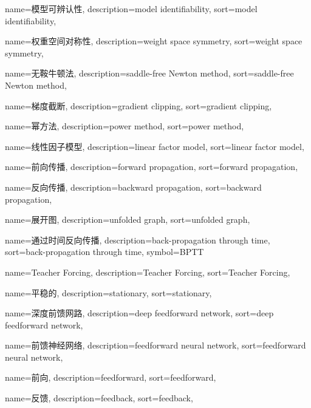 {
  name=模型可辨认性,
  description={model identifiability},
  sort={model identifiability},
}

{
  name=权重空间对称性,
  description={weight space symmetry},
  sort={weight space symmetry},
}

{
  name=无鞍牛顿法,
  description={saddle-free Newton method},
  sort={saddle-free Newton method},
}

{
  name=梯度截断,
  description={gradient clipping},
  sort={gradient clipping},
}

{
  name=幂方法,
  description={power method},
  sort={power method},
}

{
  name=线性因子模型,
  description={linear factor model},
  sort={linear factor model},
}

{
  name=前向传播,
  description={forward propagation},
  sort={forward propagation},
}

{
  name=反向传播,
  description={backward propagation},
  sort={backward propagation},
}

{
  name=展开图,
  description={unfolded graph},
  sort={unfolded graph},
}

{
  name=通过时间反向传播,
  description={back-propagation through time},
  sort={back-propagation through time},
  symbol={BPTT}
}

{
  name=Teacher Forcing,
  description={Teacher Forcing},
  sort={Teacher Forcing},
}

{
  name=平稳的,
  description={stationary},
  sort={stationary},
}

{
  name=深度前馈网路,
  description={deep feedforward network},
  sort={deep feedforward network},
}

{
  name=前馈神经网络,
  description={feedforward neural network},
  sort={feedforward neural network},
}

{
  name=前向,
  description={feedforward},
  sort={feedforward},
}

{
  name=反馈,
  description={feedback},
  sort={feedback},
}


